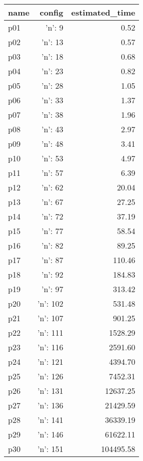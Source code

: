 \documentclass{article}
\begin{document}
                            \begin{center}
                            \scriptsize
                            \begin{tabular}{@{}l|r|r@{}}
                            name & config & estimated\_time\\\midrule
                              p01&{'n': 9}&0.52\\
  p02&{'n': 13}&0.57\\
  p03&{'n': 18}&0.68\\
  p04&{'n': 23}&0.82\\
  p05&{'n': 28}&1.05\\
  p06&{'n': 33}&1.37\\
  p07&{'n': 38}&1.96\\
  p08&{'n': 43}&2.97\\
  p09&{'n': 48}&3.41\\
  p10&{'n': 53}&4.97\\
  p11&{'n': 57}&6.39\\
  p12&{'n': 62}&20.04\\
  p13&{'n': 67}&27.25\\
  p14&{'n': 72}&37.19\\
  p15&{'n': 77}&58.54\\
  p16&{'n': 82}&89.25\\
  p17&{'n': 87}&110.46\\
  p18&{'n': 92}&184.83\\
  p19&{'n': 97}&313.42\\
  p20&{'n': 102}&531.48\\
  p21&{'n': 107}&901.25\\
  p22&{'n': 111}&1528.29\\
  p23&{'n': 116}&2591.60\\
  p24&{'n': 121}&4394.70\\
  p25&{'n': 126}&7452.31\\
  p26&{'n': 131}&12637.25\\
  p27&{'n': 136}&21429.59\\
  p28&{'n': 141}&36339.19\\
  p29&{'n': 146}&61622.11\\
  p30&{'n': 151}&104495.58
                            \end{tabular}
                            \end{center}
                    
\end{document}
